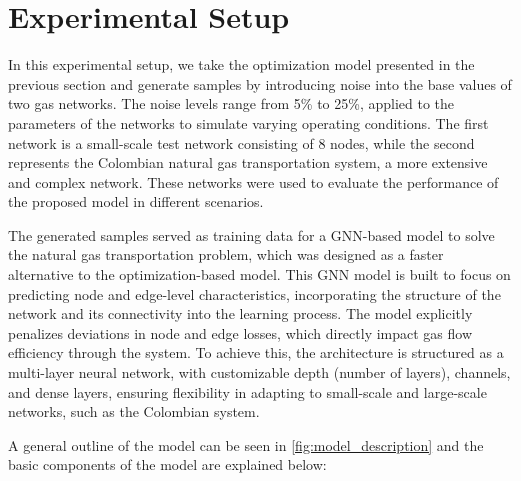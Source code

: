 
\section{Experimental Setup} \label{sec:LinealCensnet_ExperimentalSetup}



In this experimental setup, we take the optimization model presented in the previous section and generate samples by introducing noise into the base values of two gas networks. The noise levels range from 5\% to 25\%, applied to the parameters of the networks to simulate varying operating conditions. The first network is a small-scale test network consisting of 8 nodes, while the second represents the Colombian natural gas transportation system, a more extensive and complex network. These networks were used to evaluate the performance of the proposed model in different scenarios.

The generated samples served as training data for a GNN-based model to solve the natural gas transportation problem, which was designed as a faster alternative to the optimization-based model. This GNN model is built to focus on predicting node and edge-level characteristics, incorporating the structure of the network and its connectivity into the learning process. The model explicitly penalizes deviations in node and edge losses, which directly impact gas flow efficiency through the system. To achieve this, the architecture is structured as a multi-layer neural network, with customizable depth (number of layers), channels, and dense layers, ensuring flexibility in adapting to small-scale and large-scale networks, such as the Colombian system.



A general outline of the model can be seen in \cref{fig:model_description} and the basic components of the model are explained below:

